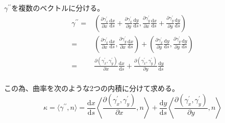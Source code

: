\documentclass[12pt,b5paper]{ltjsarticle}
\begin{document}
\begin{enumerate}
      $\gamma^{\prime\prime}$を複数のベクトルに分ける。
      \begin{align}
       \gamma^{\prime\prime}
       =& \left(
       \frac{\partial \gamma_{x}^{\prime}}{\partial x}
       \frac{\mathrm{d}x}{\mathrm{d}s}
       + \frac{\partial \gamma_{x}^{\prime}}{\partial y}
       \frac{\mathrm{d}y}{\mathrm{d}s}
       ,
       \frac{\partial \gamma_{y}^{\prime}}{\partial x}
       \frac{\mathrm{d}x}{\mathrm{d}s}
       + \frac{\partial \gamma_{y}^{\prime}}{\partial y}
       \frac{\mathrm{d}y}{\mathrm{d}s}
       \right)\\
       =&
       \left(
       \frac{\partial \gamma_{x}^{\prime}}{\partial x}
       \frac{\mathrm{d}x}{\mathrm{d}s}
       ,
       \frac{\partial \gamma_{y}^{\prime}}{\partial x}
       \frac{\mathrm{d}x}{\mathrm{d}s}
       \right)
       +
       \left(
       \frac{\partial \gamma_{x}^{\prime}}{\partial y}
       \frac{\mathrm{d}y}{\mathrm{d}s}
       ,
       \frac{\partial \gamma_{y}^{\prime}}{\partial y}
       \frac{\mathrm{d}y}{\mathrm{d}s}
       \right)\\
       =& \frac{\partial (\gamma_{x}^{\prime},\gamma_{y}^{\prime})}{\partial x}
       \frac{\mathrm{d}x}{\mathrm{d}s}
       +
       \frac{\partial (\gamma_{x}^{\prime},\gamma_{y}^{\prime})}{\partial y}
       \frac{\mathrm{d}y}{\mathrm{d}s}\\
      \end{align}

      この為、曲率を次のような2つの内積に分けて求める。
      \begin{equation}
       \kappa =
       \langle \gamma^{\prime\prime},n \rangle
       = \frac{\mathrm{d}x}{\mathrm{d}s}
       \left\langle
       \frac{\partial (\gamma_{x}^{\prime},\gamma_{y}^{\prime})}{\partial x},n \right\rangle
       + \frac{\mathrm{d}y}{\mathrm{d}s}
       \left\langle \frac{\partial (\gamma_{x}^{\prime},\gamma_{y}^{\prime})}{\partial y},n \right\rangle
      \end{equation}




\end{enumerate}
\end{document}
